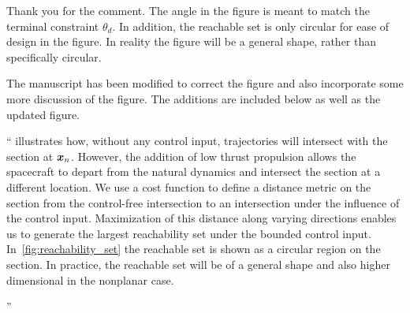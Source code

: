 \documentclass[11pt]{article}
\newenvironment{correction}{\begin{list}{}{\setlength{\leftmargin}{1cm}\setlength{\rightmargin}{1cm}}\vspace{\parsep}\item[]``}{''\end{list}}
\begin{document}
\begin{enumerate}
Thank you for the comment.
The angle in the figure is meant to match the terminal constraint \( \theta_d\).
In addition, the reachable set is only circular for ease of design in the figure.
In reality the figure will be a general shape, rather than specifically circular.

The manuscript has been modified to correct the figure and also incorporate some more discussion of the figure. 
The additions are included below as well as the updated figure.
\begin{correction}
 illustrates how, without any control input, trajectories will intersect with the \Poincare section at \( \bm{x}_n \). 
However, the addition of low thrust propulsion allows the spacecraft to depart from the natural dynamics and intersect the \Poincare section at a different location.
We use a cost function to define a distance metric on the \Poincare section from the control-free intersection to an intersection under the influence of the control input.
Maximization of this distance along varying directions enables us to generate the largest reachability set under the bounded control input.
In~\cref{fig:reachability_set} the reachable set is shown as a circular region on the \Poincare section.
In practice, the reachable set will be of a general shape and also higher dimensional in the nonplanar case.
\begin{figure}[H]
        \centering
        \begin{scaletikzpicturetowidth}{0.3\textwidth}
\end{scaletikzpicturetowidth}
\end{figure}
\end{correction}
\end{enumerate}
\end{document}
